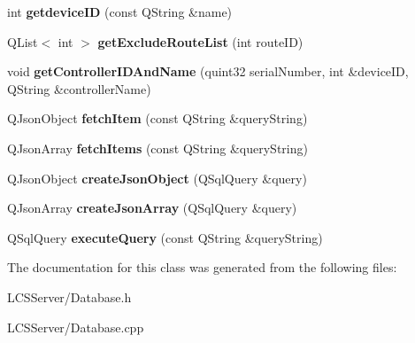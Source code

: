 \begin{DoxyCompactItemize}
int {\bfseries getdevice\+ID} (const Q\+String \&name)
\item 
\mbox{\label{class_database_a34aaa93240ff4b005b10e44ba1c6eaba}} 
Q\+List$<$ int $>$ {\bfseries get\+Exclude\+Route\+List} (int route\+ID)
\item 
\mbox{\label{class_database_a52a865e7e0e177dab5c0a451f37a1d1a}} 
void {\bfseries get\+Controller\+I\+D\+And\+Name} (quint32 serial\+Number, int \&device\+ID, Q\+String \&controller\+Name)
\item 
\mbox{\label{class_database_a1d17037c1dfaa2f67327ae0297d4567a}} 
Q\+Json\+Object {\bfseries fetch\+Item} (const Q\+String \&query\+String)
\item 
\mbox{\label{class_database_a1b1bd2990fdc80d0f4ed51f571966272}} 
Q\+Json\+Array {\bfseries fetch\+Items} (const Q\+String \&query\+String)
\item 
\mbox{\label{class_database_a82058cf13df09949bc4f6e28ce4931ba}} 
Q\+Json\+Object {\bfseries create\+Json\+Object} (Q\+Sql\+Query \&query)
\item 
\mbox{\label{class_database_a27d4e89a6c9e7bdd79a4548dcc0bafa7}} 
Q\+Json\+Array {\bfseries create\+Json\+Array} (Q\+Sql\+Query \&query)
\item 
\mbox{\label{class_database_a153d5c808b5da86954ef73b164ece2bf}} 
Q\+Sql\+Query {\bfseries execute\+Query} (const Q\+String \&query\+String)
\end{DoxyCompactItemize}


The documentation for this class was generated from the following files\+:\begin{DoxyCompactItemize}
\item 
L\+C\+S\+Server/Database.\+h\item 
L\+C\+S\+Server/Database.\+cpp\end{DoxyCompactItemize}

